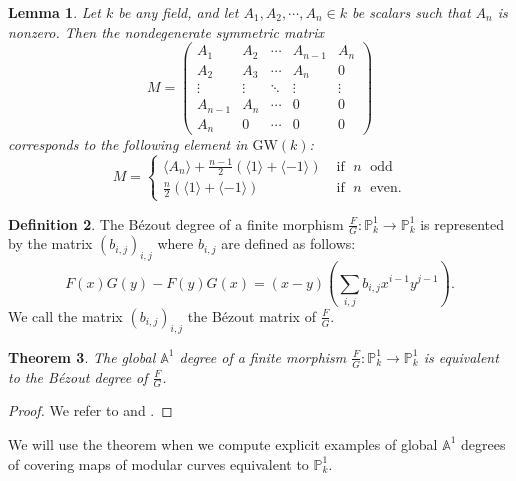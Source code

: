 \documentclass[12pt, reqno]{amsart}
\newtheorem{theorem}{Theorem}[section]
\newtheorem{lemma}[theorem]{Lemma}
\theoremstyle{definition}
\newtheorem{definition}[theorem]{Definition}
\newcommand{\A}{\mathbb{A}} %
\newcommand{\Proj}{\mathbb{P}} %
\newcommand{\GW}{\mathrm{GW}} %
\begin{document}
\begin{lemma} \label{bezoutlemma}
Let $k$ be any field, and let $A_1, A_2, \cdots, A_n \in k$ be scalars such that $A_n$ is nonzero. Then the nondegenerate symmetric matrix 
\begin{equation*}
    M = \begin{pmatrix}
    A_1 & A_2 & \cdots & A_{n-1} & A_n \\
    A_2 & A_3 & \cdots & A_n & 0 \\
    \vdots & \vdots & \ddots & \vdots & \vdots \\
    A_{n-1} & A_n & \cdots & 0 & 0 \\
    A_n & 0 & \cdots & 0 & 0
    \end{pmatrix}
\end{equation*}
corresponds to the following element in $\GW(k)$:
\begin{equation*}
    M = \begin{cases}
    \langle A_n \rangle + \frac{n-1}{2} \left( \langle 1 \rangle + \langle -1 \rangle  \right) \; &\text{if } \; n \; \text{ odd} \\
    \frac{n}{2} \left( \langle 1 \rangle + \langle -1 \rangle \right) \; &\text{if } \; n \; \text{ even}.
    \end{cases}
\end{equation*}
\end{lemma}

\begin{definition}
The B\'ezout degree of a finite morphism $\frac{F}{G}: \Proj^1_k \to \Proj^1_k$ is represented by the matrix $\left( b_{i,j} \right)_{i,j}$ where $b_{i,j}$ are defined as follows:
\begin{equation*}
    F(x)G(y) - F(y)G(x) = (x-y) \left( \sum_{i,j} b_{i,j} x^{i-1} y^{j-1} \right).
\end{equation*}
We call the matrix $\left(b_{i,j} \right)_{i,j}$ the B\'ezout matrix of $\frac{F}{G}$.
\end{definition}

\begin{theorem} \label{thm:globalA1Bezout}
The global $\A^1$ degree of a finite morphism $\frac{F}{G}: \Proj^1_k \to \Proj^1_k$ is equivalent to the B\'ezout degree of $\frac{F}{G}$.
\end{theorem}
\begin{proof}
We refer to \cite[Theorem 3]{kwBezout} and \cite[Theorem 1.2]{cazanave}.
\end{proof}
We will use the theorem when we compute explicit examples of global $\A^1$ degrees of covering maps of modular curves equivalent to $\mathbb{P}^1_k$.
\end{document}

